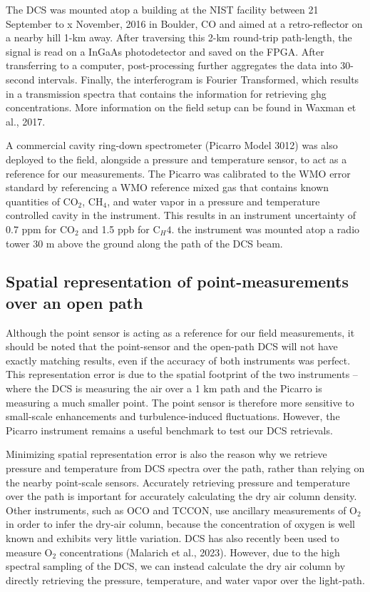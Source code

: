 \documentclass[amt, manuscript]{copernicus}
\begin{document}
The DCS was mounted atop a building at the NIST facility between 21 September to x November, 2016 in Boulder, CO and aimed at a retro-reflector on a nearby hill 1-km away. After traversing this 2-km round-trip path-length, the signal is read on a InGaAs photodetector and saved on the FPGA. After transferring to a computer, post-processing further aggregates the data into 30-second intervals. Finally, the interferogram is Fourier Transformed, which results in a transmission spectra that contains the information for retrieving ghg concentrations. More information on the field setup can be found in Waxman et al., 2017. 

A commercial cavity ring-down spectrometer (Picarro Model 3012) was also deployed to the field, alongside a pressure and temperature sensor, to act as a reference for our measurements. The Picarro was calibrated to the WMO error standard by referencing a WMO reference mixed gas that contains known quantities of CO$_2$, CH$_4$, and water vapor in a pressure and temperature controlled cavity in the instrument. This results in an instrument uncertainty of 0.7 ppm for CO$_2$ and 1.5 ppb for C$_H4$. the instrument was mounted atop a radio tower 30 m above the ground along the path of the DCS beam. 

\subsection{Spatial representation of point-measurements over an open path}
Although the point sensor is acting as a reference for our field measurements, it should be noted that the point-sensor and the open-path DCS will not have exactly matching results, even if the accuracy of both instruments was perfect. This representation error is due to the spatial footprint of the two instruments – where the DCS is measuring the air over a 1 km path and the Picarro is measuring a much smaller point. The point sensor is therefore more sensitive to small-scale enhancements and turbulence-induced fluctuations. However, the Picarro instrument remains a useful benchmark to test our DCS retrievals.

Minimizing spatial representation error is also the reason why we retrieve pressure and temperature from DCS spectra over the path, rather than relying on the nearby point-scale sensors. Accurately retrieving pressure and temperature over the path is important for accurately calculating the dry air column density. Other instruments, such as OCO and TCCON, use ancillary measurements of O$_2$ in order to infer the dry-air column, because the concentration of oxygen is well known and exhibits very little variation. DCS has also recently been used to measure O$_2$ concentrations (Malarich et al., 2023). However, due to the high spectral sampling of the DCS, we can instead calculate the dry air column by directly retrieving the pressure, temperature, and water vapor over the light-path.  
\end{document}
